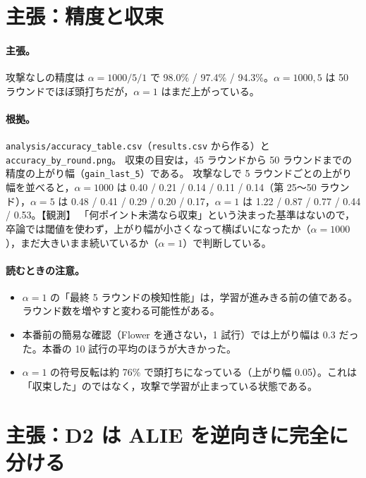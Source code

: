 \documentclass[a4j, dvipdfmx]{jsarticle}  %
\begin{document}
\section{主張：精度と収束}
\label{sec:claim-acc}

\paragraph{主張。}
攻撃なしの精度は $\alpha = 1000 / 5 / 1$ で 98.0\% / 97.4\% / 94.3\%。$\alpha = 1000, 5$ は 50 ラウンドでほぼ頭打ちだが，$\alpha = 1$ はまだ上がっている。

\paragraph{根拠。}
\texttt{analysis/accuracy\_table.csv}（\texttt{results.csv} から作る）と \texttt{accuracy\_by\_round.png}。
収束の目安は，45 ラウンドから 50 ラウンドまでの精度の上がり幅（\texttt{gain\_last\_5}）である。
攻撃なしで 5 ラウンドごとの上がり幅を並べると，$\alpha = 1000$ は 0.40 / 0.21 / 0.14 / 0.11 / 0.14（第 25〜50 ラウンド），$\alpha = 5$ は 0.48 / 0.41 / 0.29 / 0.20 / 0.17，$\alpha = 1$ は 1.22 / 0.87 / 0.77 / 0.44 / 0.53。【観測】
「何ポイント未満なら収束」という決まった基準はないので，卒論では閾値を使わず，上がり幅が小さくなって横ばいになったか（$\alpha = 1000$），まだ大きいまま続いているか（$\alpha = 1$）で判断している。

\paragraph{読むときの注意。}
\begin{itemize}
  \item $\alpha = 1$ の「最終 5 ラウンドの検知性能」は，学習が進みきる前の値である。ラウンド数を増やすと変わる可能性がある。
  \item 本番前の簡易な確認（Flower を通さない，1 試行）では上がり幅は 0.3 だった。本番の 10 試行の平均のほうが大きかった。
  \item $\alpha = 1$ の符号反転は約 76\% で頭打ちになっている（上がり幅 0.05）。これは「収束した」のではなく，攻撃で学習が止まっている状態である。
\end{itemize}

\section{主張：D2 は ALIE を逆向きに完全に分ける}
\label{sec:claim-d2}
\end{document}
